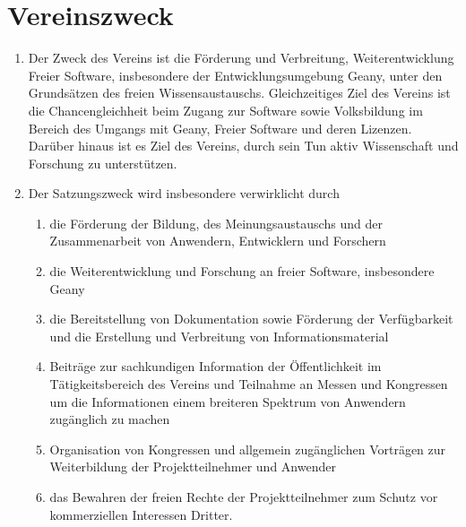 \documentclass[fontsize=12pt,paper=a4,pagesize,headings=small]{scrartcl}
\begin{document}
\section{Vereinszweck}
\begin{enumerate}
    \item Der Zweck des Vereins ist die Förderung und Verbreitung,
    Weiterentwicklung Freier Software, insbesondere der
    Entwicklungsumgebung Geany, unter den Grundsätzen des freien
    Wissensaustauschs. Gleichzeitiges Ziel des Vereins ist die
    Chancengleichheit beim Zugang zur Software sowie Volksbildung im
    Bereich des Umgangs mit Geany, Freier Software und deren Lizenzen.
    Darüber hinaus ist es Ziel des Vereins, durch sein Tun aktiv
    Wissenschaft und Forschung zu unterstützen.

    \item Der Satzungszweck wird insbesondere verwirklicht durch

    \begin{enumerate}
        \item die Förderung der Bildung, des Meinungsaustauschs und der
        Zusammenarbeit von Anwendern, Entwicklern und Forschern

        \item die Weiterentwicklung und Forschung an freier Software,
        insbesondere Geany

        \item die Bereitstellung von Dokumentation sowie
        Förderung der Verfügbarkeit und die Erstellung und
        Verbreitung von Informationsmaterial

        \item Beiträge zur sachkundigen Information der Öffentlichkeit
        im Tätigkeitsbereich des Vereins und Teilnahme an Messen und
        Kongressen um die Informationen einem breiteren Spektrum von
        Anwendern zugänglich zu machen

        \item Organisation von Kongressen und allgemein zugänglichen
        Vorträgen zur Weiterbildung der Projektteilnehmer und Anwender

        \item das Bewahren der freien Rechte der Projektteilnehmer zum
        Schutz vor kommerziellen Interessen Dritter.
    \end{enumerate}
\end{enumerate}
\end{document}
